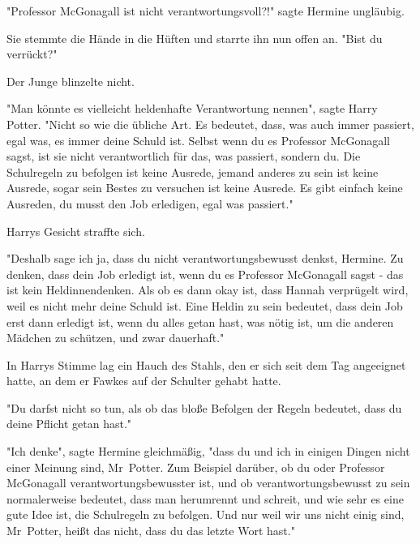 {"Professor McGonagall ist nicht verantwortungsvoll?!" sagte Hermine ungläubig.

Sie stemmte die Hände in die Hüften und starrte ihn nun offen an. "Bist du verrückt?"

Der Junge blinzelte nicht.

"Man könnte es vielleicht heldenhafte Verantwortung nennen", sagte Harry Potter. "Nicht so wie die übliche Art. Es bedeutet, dass, was auch immer passiert, egal was, es immer deine Schuld ist. Selbst wenn du es Professor McGonagall sagst, ist sie nicht verantwortlich für das, was passiert, sondern du. Die Schulregeln zu befolgen ist keine Ausrede, jemand anderes zu sein ist keine Ausrede, sogar sein Bestes zu versuchen ist keine Ausrede. Es gibt einfach keine Ausreden, du musst den Job erledigen, egal was passiert."

Harrys Gesicht straffte sich.

"Deshalb sage ich ja, dass du nicht verantwortungsbewusst denkst, Hermine. Zu denken, dass dein Job erledigt ist, wenn du es Professor McGonagall sagst - das ist kein Heldinnendenken. Als ob es dann okay ist, dass Hannah verprügelt wird, weil es nicht mehr deine Schuld ist. Eine Heldin zu sein bedeutet, dass dein Job erst dann erledigt ist, wenn du alles getan hast, was nötig ist, um die anderen Mädchen zu schützen, und zwar dauerhaft."

In Harrys Stimme lag ein Hauch des Stahls, den er sich seit dem Tag angeeignet hatte, an dem er Fawkes auf der Schulter gehabt hatte.

"Du darfst nicht so tun, als ob das bloße Befolgen der Regeln bedeutet, dass du deine Pflicht getan hast."

"Ich denke", sagte Hermine gleichmäßig, "dass du und ich in einigen Dingen nicht einer Meinung sind, Mr~Potter. Zum Beispiel darüber, ob du oder Professor McGonagall verantwortungsbewusster ist, und ob verantwortungsbewusst zu sein normalerweise bedeutet, dass man herumrennt und schreit, und wie sehr es eine gute Idee ist, die Schulregeln zu befolgen. Und nur weil wir uns nicht einig sind, Mr~Potter, heißt das nicht, dass du das letzte Wort hast."

}
